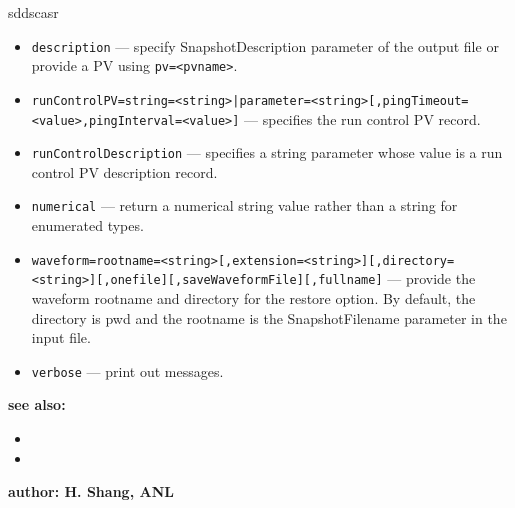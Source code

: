 \begin{sddsprog}{sddscasr}
\begin{itemize}
  \item {\tt description} --- specify SnapshotDescription parameter of the output file or provide a PV using {\tt pv=<pvname>}.
  \item {\tt runControlPV=string=<string>|parameter=<string>[,pingTimeout=<value>,pingInterval=<value>]} --- specifies the run control PV record.
  \item {\tt runControlDescription} --- specifies a string parameter whose value is a run control PV description record.
  \item {\tt numerical} --- return a numerical string value rather than a string for enumerated types.
  \item {\tt waveform=rootname=<string>[,extension=<string>][,directory=<string>][,onefile][,saveWaveformFile][,fullname]} --- provide the waveform rootname and directory for the restore option. By default, the directory is pwd and the rootname is the SnapshotFilename parameter in the input file.
  \item {\tt verbose} --- print out messages.
  \end{itemize}

\item {\bf see also:}
    \begin{itemize}
%
%
    \item {}
    \item {}
    \end{itemize}
%
%
\item {\bf author: H. Shang, ANL}
\end{sddsprog}
